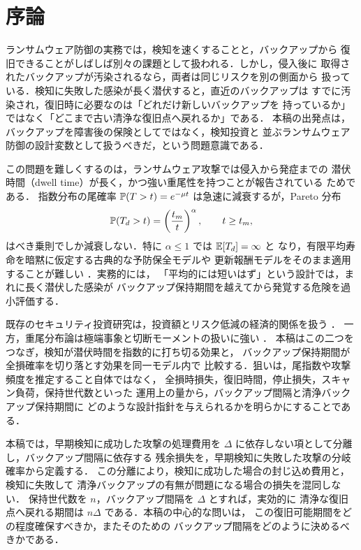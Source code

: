 \section{序論}

ランサムウェア防御の実務では，検知を速くすることと，バックアップから
復旧できることがしばしば別々の課題として扱われる．しかし，侵入後に
取得されたバックアップが汚染されるなら，両者は同じリスクを別の側面から
扱っている．検知に失敗した感染が長く潜伏すると，直近のバックアップは
すでに汚染され，復旧時に必要なのは「どれだけ新しいバックアップを
持っているか」ではなく「どこまで古い清浄な復旧点へ戻れるか」である．
本稿の出発点は，バックアップを障害後の保険としてではなく，検知投資と
並ぶランサムウェア防御の設計変数として扱うべきだ，という問題意識である．

この問題を難しくするのは，ランサムウェア攻撃では侵入から発症までの
潜伏時間（dwell time）が長く，かつ強い重尾性を持つことが報告されている
\cite{mandiant2023,ibm2023,verizon2023,crowdstrike2023} ためである．
指数分布の尾確率 $\mathbb{P}(T>t)=e^{-\mu t}$ は急速に減衰するが，Pareto 分布
\[
  \mathbb{P}(T_d>t)=\left(\frac{t_m}{t}\right)^\alpha,\qquad t\ge t_m,
\]
はべき乗則でしか減衰しない．特に $\alpha\le 1$ では $\mathbb{E}[T_d]=\infty$ と
なり，有限平均寿命を暗黙に仮定する古典的な予防保全モデルや
更新報酬モデルをそのまま適用することが難しい
\cite{feller1971,cox1962,barlow1965,nakagawa2005}．実務的には，
「平均的には短いはず」という設計では，まれに長く潜伏した感染が
バックアップ保持期間を越えてから発覚する危険を過小評価する．

既存のセキュリティ投資研究は，投資額とリスク低減の経済的関係を扱う
\cite{gordonloeb2002,hausken2006,laszka2017,fielder2016}．
一方，重尾分布論は極端事象と切断モーメントの扱いに強い
\cite{embrechts1997,resnick2007,bingham1989}．
本稿はこの二つをつなぎ，検知が潜伏時間を指数的に打ち切る効果と，
バックアップ保持期間が全損確率を切り落とす効果を同一モデル内で
比較する．狙いは，尾指数や攻撃頻度を推定すること自体ではなく，
全損時損失，復旧時間，停止損失，スキャン負荷，保持世代数といった
運用上の量から，バックアップ間隔と清浄バックアップ保持期間に
どのような設計指針を与えられるかを明らかにすることである．

本稿では，早期検知に成功した攻撃の処理費用を
$\Delta$ に依存しない項として分離し，バックアップ間隔に依存する
残余損失を，早期検知に失敗した攻撃の分岐確率から定義する．
この分離により，検知に成功した場合の封じ込め費用と，検知に失敗して
清浄バックアップの有無が問題になる場合の損失を混同しない．
保持世代数を $n$，バックアップ間隔を $\Delta$ とすれば，実効的に
清浄な復旧点へ戻れる期間は $n\Delta$ である．本稿の中心的な問いは，
この復旧可能期間をどの程度確保すべきか，またそのための
バックアップ間隔をどのように決めるべきかである．

